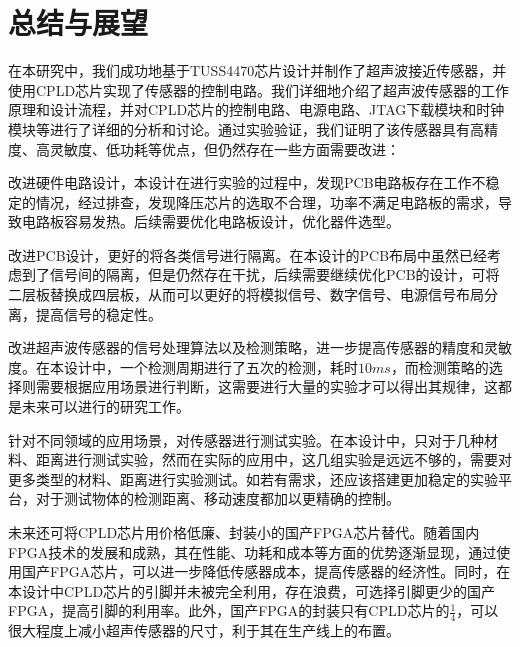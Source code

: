 \newpage
\section{总结与展望}
在本研究中，我们成功地基于TUSS4470芯片设计并制作了超声波接近传感器，并使用CPLD芯片实现了传感器的控制电路。我们详细地介绍了超声波传感器的工作原理和设计流程，并对CPLD芯片的控制电路、电源电路、JTAG下载模块和时钟模块等进行了详细的分析和讨论。通过实验验证，我们证明了该传感器具有高精度、高灵敏度、低功耗等优点，但仍然存在一些方面需要改进：\par
改进硬件电路设计，本设计在进行实验的过程中，发现PCB电路板存在工作不稳定的情况，经过排查，发现降压芯片的选取不合理，功率不满足电路板的需求，导致电路板容易发热。后续需要优化电路板设计，优化器件选型。\par
改进PCB设计，更好的将各类信号进行隔离。在本设计的PCB布局中虽然已经考虑到了信号间的隔离，但是仍然存在干扰，后续需要继续优化PCB的设计，可将二层板替换成四层板，从而可以更好的将模拟信号、数字信号、电源信号布局分离，提高信号的稳定性。\par
改进超声波传感器的信号处理算法以及检测策略，进一步提高传感器的精度和灵敏度。在本设计中，一个检测周期进行了五次的检测，耗时$10ms$，而检测策略的选择则需要根据应用场景进行判断，这需要进行大量的实验才可以得出其规律，这都是未来可以进行的研究工作。\par
针对不同领域的应用场景，对传感器进行测试实验。在本设计中，只对于几种材料、距离进行测试实验，然而在实际的应用中，这几组实验是远远不够的，需要对更多类型的材料、距离进行实验测试。如若有需求，还应该搭建更加稳定的实验平台，对于测试物体的检测距离、移动速度都加以更精确的控制。\par
未来还可将CPLD芯片用价格低廉、封装小的国产FPGA芯片替代。随着国内FPGA技术的发展和成熟，其在性能、功耗和成本等方面的优势逐渐显现，通过使用国产FPGA芯片，可以进一步降低传感器成本，提高传感器的经济性。同时，在本设计中CPLD芯片的引脚并未被完全利用，存在浪费，可选择引脚更少的国产FPGA，提高引脚的利用率。此外，国产FPGA的封装只有CPLD芯片的$\frac{1}{4}$，可以很大程度上减小超声传感器的尺寸，利于其在生产线上的布置。\par


